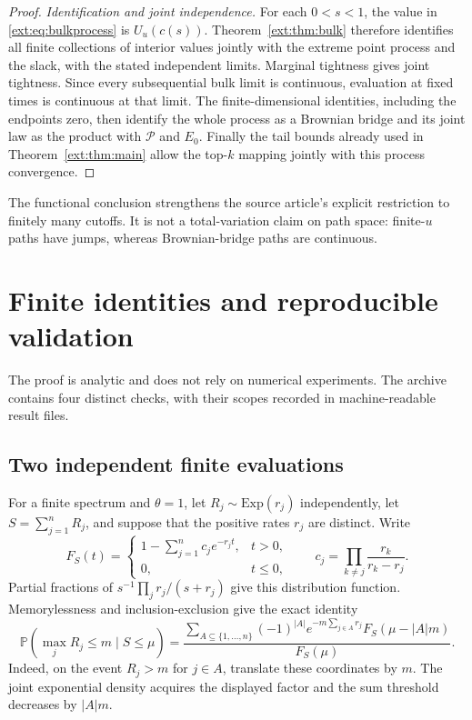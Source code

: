 \documentclass[11pt]{article}
\theoremstyle{definition}
\theoremstyle{remark}
\begin{document}
\begin{proof}
\emph{Identification and joint independence.}
For each $0<s<1$, the value in \eqref{ext:eq:bulkprocess} is
$U_u(c(s))$.  Theorem~\ref{ext:thm:bulk} therefore identifies all finite
collections of interior values jointly with the extreme point process
and the slack, with the stated independent limits.  Marginal tightness
gives joint tightness.  Since every subsequential bulk limit is
continuous, evaluation at fixed times is continuous at that limit.
The finite-dimensional identities, including the endpoints zero, then
identify the whole process as a Brownian bridge and its joint law as
the product with $\mathcal P$ and $E_0$.  Finally the tail bounds already
used in Theorem~\ref{ext:thm:main} allow the top-$k$ mapping jointly with
this process convergence.
\end{proof}

The functional conclusion strengthens the source article's explicit
restriction to finitely many cutoffs.  It is not a total-variation claim
on path space: finite-$u$ paths have jumps, whereas Brownian-bridge paths
are continuous.


\section{Finite identities and reproducible validation}
\label{sec:computation}

The proof is analytic and does not rely on numerical experiments. The
archive contains four distinct checks, with their scopes recorded in
machine-readable result files.

\subsection{Two independent finite evaluations}

For a finite spectrum and $\theta=1$, let
$R_j\sim\mathrm{Exp}(r_j)$ independently, let $S=\sum_{j=1}^nR_j$,
and suppose that the positive rates $r_j$ are distinct. Write
\[
 F_S(t)=\begin{cases}
 1-\displaystyle\sum_{j=1}^n c_je^{-r_jt},&t>0,\\
 0,&t\le0,
 \end{cases}
 \qquad c_j=\prod_{k\ne j}\frac{r_k}{r_k-r_j}.
\]
Partial fractions of $s^{-1}\prod_jr_j/(s+r_j)$ give this distribution
function. Memorylessness and inclusion-exclusion give the exact identity
\begin{equation}\label{comp:eq:finite}
 \mathbb P(\max_jR_j\le m\mid S\le\mu)=
 \frac{\displaystyle\sum_{A\subseteq\{1,\ldots,n\}}
  (-1)^{|A|}e^{-m\sum_{j\in A}r_j}F_S(\mu-|A|m)}{F_S(\mu)}.
\end{equation}
Indeed, on the event $R_j>m$ for $j\in A$, translate these coordinates by
$m$. The joint exponential density acquires the displayed factor and the
sum threshold decreases by $|A|m$.
\end{document}
